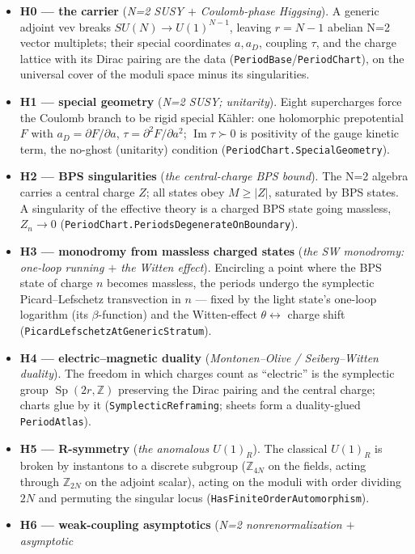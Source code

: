 \documentclass{article}
\theoremstyle{plain}
\theoremstyle{definition}
\numberwithin{equation}{section}
\newcommand{\Z}{\mathbb{Z}}
\newcommand{\Sp}{\operatorname{Sp}}
\newcommand{\Imag}{\operatorname{Im}}
\newcommand{\code}[1]{\texttt{#1}}
\begin{document}
\begin{itemize}
\item \textbf{H0 --- the carrier} (\emph{N=2 SUSY $+$ Coulomb-phase Higgsing}). A generic adjoint
vev breaks $SU(N)\to U(1)^{N-1}$, leaving $r=N-1$ abelian N=2 vector multiplets; their special
coordinates $a, a_D$, coupling $\tau$, and the charge lattice with its Dirac pairing are the data
(\code{PeriodBase}/\code{PeriodChart}), on the universal cover of the moduli space minus its singularities.
\item \textbf{H1 --- special geometry} (\emph{N=2 SUSY; unitarity}). Eight supercharges force the
Coulomb branch to be rigid special K\"ahler: one holomorphic prepotential $F$ with
$a_D = \partial F/\partial a$, $\tau = \partial^2 F/\partial a^2$; $\Imag\tau\succ 0$ is positivity
of the gauge kinetic term, the no-ghost (unitarity) condition (\code{PeriodChart.SpecialGeometry}).
\item \textbf{H2 --- BPS singularities} (\emph{the central-charge BPS bound}). The N=2 algebra
carries a central charge $Z$; all states obey $M\ge|Z|$, saturated by BPS states. A singularity of
the effective theory is a charged BPS state going massless, $Z_n\to 0$
(\code{PeriodChart.PeriodsDegenerateOnBoundary}).
\item \textbf{H3 --- monodromy from massless charged states} (\emph{the SW monodromy: one-loop
running $+$ the Witten effect}). Encircling a point where the BPS state of charge $n$ becomes
massless, the periods undergo the symplectic Picard--Lefschetz transvection in $n$ --- fixed by the
light state's one-loop logarithm (its $\beta$-function) and the Witten-effect $\theta\leftrightarrow$
charge shift (\code{PicardLefschetzAtGenericStratum}).
\item \textbf{H4 --- electric--magnetic duality} (\emph{Montonen--Olive / Seiberg--Witten duality}).
The freedom in which charges count as ``electric'' is the symplectic group $\Sp(2r,\Z)$ preserving
the Dirac pairing and the central charge; charts glue by it (\code{SymplecticReframing}; sheets form a
duality-glued \code{PeriodAtlas}).
\item \textbf{H5 --- R-symmetry} (\emph{the anomalous $U(1)_R$}). The classical $U(1)_R$ is broken
by instantons to a discrete subgroup ($\Z_{4N}$ on the fields, acting through $\Z_{2N}$ on the
adjoint scalar), acting on the moduli with order dividing $2N$ and permuting the singular locus
(\code{HasFiniteOrderAutomorphism}).
\item \textbf{H6 --- weak-coupling asymptotics} (\emph{N=2 nonrenormalization $+$ asymptotic
}
\end{itemize}
\end{document}

